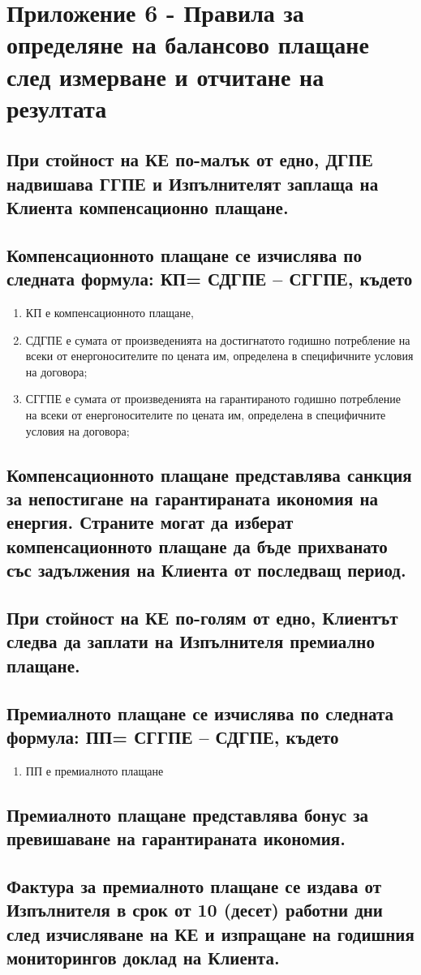 \section{Приложение 6 - Правила за определяне на балансово плащане след измерване и отчитане на резултата}

\subsection{При стойност на КЕ по-малък от едно, ДГПЕ надвишава ГГПЕ и Изпълнителят заплаща на Клиента компенсационно плащане.}

\subsection{Компенсационното плащане се изчислява по следната формула: КП= СДГПЕ – СГГПЕ, където}

\begin{enumerate}
	\item КП е компенсационното плащане,
	\item СДГПЕ е сумата от произведенията на достигнатото годишно потребление на всеки от енергоносителите по цената им, определена в специфичните условия на договора;
	\item СГГПЕ е сумата от произведенията на гарантираното годишно потребление на всеки от енергоносителите по цената им, определена в специфичните условия на договора;
\end{enumerate}

\subsection{Компенсационното плащане представлява санкция за непостигане на гарантираната икономия на енергия. Страните могат да изберат компенсационното плащане да бъде прихванато със задължения на Клиента от последващ период.}

\subsection{При стойност на КЕ по-голям от едно, Клиентът следва да заплати на Изпълнителя премиално плащане.}

\subsection{Премиалното плащане се изчислява по следната формула: ПП= СГГПЕ – СДГПЕ, където}
\begin{enumerate}
	\item ПП е премиалното плащане
\end{enumerate}

\subsection{Премиалното плащане представлява бонус за превишаване на гарантираната икономия.}

\subsection{Фактура за премиалното плащане се издава от Изпълнителя в срок от 10 (десет) работни дни след изчисляване на КЕ и изпращане на годишния мониторингов доклад на Клиента.}
